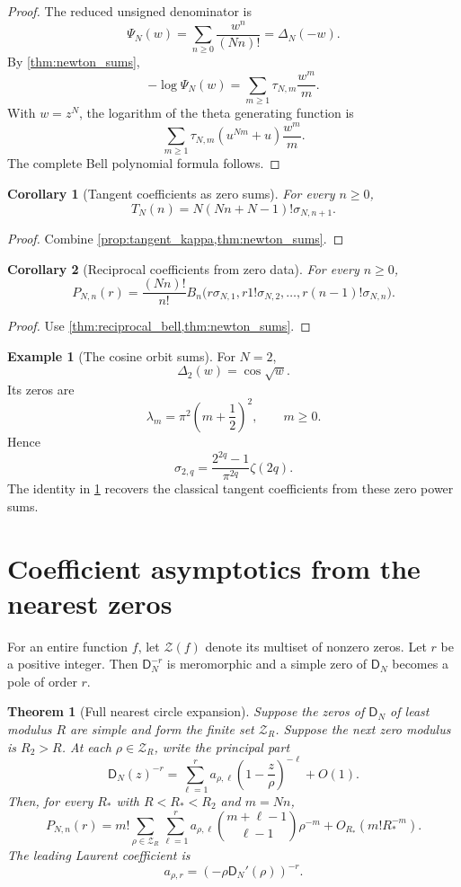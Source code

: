 \documentclass{aomart}
\newtheorem{theorem}{Theorem}[section]
\newtheorem{corollary}[corollary]{Corollary}
\theoremstyle{definition}
\newtheorem{example}[example]{Example}
\theoremstyle{remark}
\newcommand{\Zcal}{\mathcal Z}
\newcommand{\Dfun}{\mathsf D}
\begin{document}
\begin{proof}
The reduced unsigned denominator is
\[
\Psi_N(w)=\sum_{n\geq0}\frac{w^n}{(Nn)!}=\Delta_N(-w).
\]
By \cref{thm:newton_sums},
\[
-\log\Psi_N(w)
=
\sum_{m\geq1}\tau_{N,m}\frac{w^m}{m}.
\]
With $w=z^N$, the logarithm of the theta generating function is
\[
\sum_{m\geq1}
\tau_{N,m}(u^{Nm}+u)\frac{w^m}{m}.
\]
The complete Bell polynomial formula follows.
\end{proof}

\begin{corollary}[Tangent coefficients as zero sums]\label{cor:tangent_zero_sums}
For every $n\geq0$,
\[
T_N(n)
=
N(Nn+N-1)!\sigma_{N,n+1}.
\]
\end{corollary}

\begin{proof}
Combine \cref{prop:tangent_kappa,thm:newton_sums}.
\end{proof}

\begin{corollary}[Reciprocal coefficients from zero data]\label{cor:reciprocal_zero_data}
For every $n\geq0$,
\[
P_{N,n}(r)
=
\frac{(Nn)!}{n!}
B_n\bigl(
 r\sigma_{N,1},
 r1!\sigma_{N,2},
 \ldots,
 r(n-1)!\sigma_{N,n}
\bigr).
\]
\end{corollary}

\begin{proof}
Use \cref{thm:reciprocal_bell,thm:newton_sums}.
\end{proof}

\begin{example}[The cosine orbit sums]\label{ex:cosine_orbit_sums}
For $N=2$,
\[
\Delta_2(w)=\cos\sqrt w.
\]
Its zeros are
\[
\lambda_m=\pi^2\left(m+\frac12\right)^2,
\qquad m\geq0.
\]
Hence
\[
\sigma_{2,q}
=
\frac{2^{2q}-1}{\pi^{2q}}\zeta(2q).
\]
The identity in \cref{cor:tangent_zero_sums} recovers the classical tangent coefficients from these zero power sums.
\end{example}

\section{Coefficient asymptotics from the nearest zeros}\label{sec:coefficient_asymptotics}

For an entire function $f$, let $\Zcal(f)$ denote its multiset of nonzero zeros.  Let $r$ be a positive integer.  Then $\Dfun_N^{-r}$ is meromorphic and a simple zero of $\Dfun_N$ becomes a pole of order $r$.

\begin{theorem}[Full nearest circle expansion]\label{thm:nearest_circle_expansion}
Suppose the zeros of $\Dfun_N$ of least modulus $R$ are simple and form the finite set $\Zcal_R$.  Suppose the next zero modulus is $R_2>R$.  At each $\rho\in\Zcal_R$, write the principal part
\[
\Dfun_N(z)^{-r}
=
\sum_{\ell=1}^{r}
 a_{\rho,\ell}
\left(1-\frac z\rho\right)^{-\ell}
+
O(1).
\]
Then, for every $R_*$ with $R<R_*<R_2$ and $m=Nn$,
\[
P_{N,n}(r)
=
 m!
\sum_{\rho\in\Zcal_R}
\sum_{\ell=1}^{r}
 a_{\rho,\ell}
\binom{m+\ell-1}{\ell-1}
\rho^{-m}
+
O_{R_*}(m!R_*^{-m}).
\]
The leading Laurent coefficient is
\[
a_{\rho,r}
=
(-\rho\Dfun_N'(\rho))^{-r}.
\]
\end{theorem}
\end{document}
